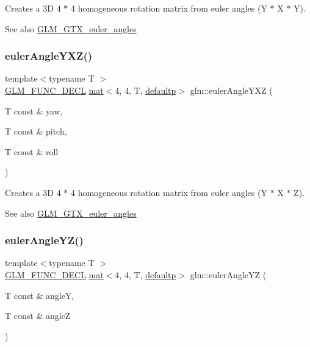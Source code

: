 Creates a 3D 4 $\ast$ 4 homogeneous rotation matrix from euler angles (Y $\ast$ X $\ast$ Y). \begin{DoxySeeAlso}{See also}
\hyperlink{group__gtx__euler__angles}{G\+L\+M\+\_\+\+G\+T\+X\+\_\+euler\+\_\+angles} 
\end{DoxySeeAlso}
\mbox{\label{group__gtx__euler__angles_gab8ba99a9814f6d9edf417b6c6d5b0c10}} 
\subsubsection{\texorpdfstring{euler\+Angle\+Y\+X\+Z()}{eulerAngleYXZ()}}
{\footnotesize\ttfamily template$<$typename T $>$ \\
\hyperlink{setup_8hpp_ab2d052de21a70539923e9bcbf6e83a51}{G\+L\+M\+\_\+\+F\+U\+N\+C\+\_\+\+D\+E\+CL} \hyperlink{structglm_1_1mat}{mat}$<$4, 4, T, \hyperlink{namespaceglm_a36ed105b07c7746804d7fdc7cc90ff25a9d21ccd8b5a009ec7eb7677befc3bf51}{defaultp}$>$ glm\+::euler\+Angle\+Y\+XZ (\begin{DoxyParamCaption}\item[{T const \&}]{yaw,  }\item[{T const \&}]{pitch,  }\item[{T const \&}]{roll }\end{DoxyParamCaption})}

Creates a 3D 4 $\ast$ 4 homogeneous rotation matrix from euler angles (Y $\ast$ X $\ast$ Z). \begin{DoxySeeAlso}{See also}
\hyperlink{group__gtx__euler__angles}{G\+L\+M\+\_\+\+G\+T\+X\+\_\+euler\+\_\+angles} 
\end{DoxySeeAlso}
\mbox{\label{group__gtx__euler__angles_ga220379e10ac8cca55e275f0c9018fed9}} 
\subsubsection{\texorpdfstring{euler\+Angle\+Y\+Z()}{eulerAngleYZ()}}
{\footnotesize\ttfamily template$<$typename T $>$ \\
\hyperlink{setup_8hpp_ab2d052de21a70539923e9bcbf6e83a51}{G\+L\+M\+\_\+\+F\+U\+N\+C\+\_\+\+D\+E\+CL} \hyperlink{structglm_1_1mat}{mat}$<$4, 4, T, \hyperlink{namespaceglm_a36ed105b07c7746804d7fdc7cc90ff25a9d21ccd8b5a009ec7eb7677befc3bf51}{defaultp}$>$ glm\+::euler\+Angle\+YZ (\begin{DoxyParamCaption}\item[{T const \&}]{angleY,  }\item[{T const \&}]{angleZ }\end{DoxyParamCaption})}

